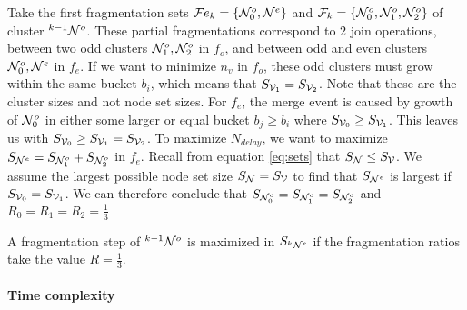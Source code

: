 Take the first fragmentation sets $\mathcal{F}e_{k} = \{\mathcal{N}^o_0, \mathcal{N}^{e} \}$ and $\mathcal{F}_{k} = \{\mathcal{N}^o_0, \mathcal{N}^{o}_1, \mathcal{N}^{o}_2 \}$ of cluster ${}^{k-1}\mathcal{N}^o$. These partial fragmentations correspond to 2 join operations, between two odd clusters $ \mathcal{N}^{o}_1, \mathcal{N}^{o}_2 $ in $f_o$, and between odd and even clusters $\mathcal{N}^o_0, \mathcal{N}^{e} $ in $f_e$. If we want to minimize $n_v$ in $f_o$, these odd clusters must grow within the same bucket $b_i$, which means that $S_{\mathcal{V}_1} = S_{\mathcal{V}_2}$. Note that these are the cluster sizes and not node set sizes. For $f_e$, the merge event is caused by growth of $\mathcal{N}^o_0$ in either some larger or equal bucket $b_j \geq b_i$ where $ S_{\mathcal{V}_0} \geq S_{\mathcal{V}_1} $. This leaves us with $S_{\mathcal{V}_0} \geq S_{\mathcal{V}_1} = S_{\mathcal{V}_2}$. To maximize $N_{delay}$, we want to maximize $S_{\mathcal{N}^e} = S_{\mathcal{N}^o_1} + S_{\mathcal{N}^o_2}$ in $f_e$. Recall from equation \ref{eq:sets} that $S_{\mathcal{N}} \leq S_{\mathcal{V}}$. We assume the largest possible node set size $S_{\mathcal{N}} = S_{\mathcal{V}}$ to find that $ S_{\mathcal{N}^e} $ is largest if $S_{\mathcal{V}_0} = S_{\mathcal{V}_1}$. We can therefore conclude that $S_{\mathcal{N}^o_0} = S_{\mathcal{N}^o_1} = S_{\mathcal{N}^o_2}$ and $R_0 = R_1 = R_2 = \frac{1}{3}$

\begin{lemma}\label{lem:thirdratio}
  A fragmentation step of ${}^{k-1}\mathcal{N}^o$ is maximized in $S_{{}^{k}\mathcal{N}^e}$ if the fragmentation ratios take the value $R = \frac{1}{3}$.
\end{lemma}

\paragraph{Time complexity}

